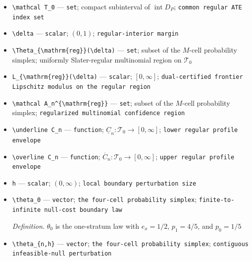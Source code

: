 \documentclass{article}
\begin{document}
\begin{itemize}
  \item \texttt{\textbackslash{}\allowbreak{}mathcal T\_\allowbreak{}0} --- \texttt{set}; compact subinterval of \(\operatorname{int}D_P\); \texttt{common regular ATE index set}
  \item \texttt{\textbackslash{}\allowbreak{}delta} --- \texttt{scalar}; \((0,1)\); \texttt{regular-\allowbreak{}interior margin}
  \item \texttt{\textbackslash{}\allowbreak{}Theta\_\allowbreak{}\{\textbackslash{}\allowbreak{}mathrm\{reg\}\allowbreak{}\}\allowbreak{}(\textbackslash{}\allowbreak{}delta)} --- \texttt{set}; subset of the \(M\)-cell probability simplex; uniformly Slater-regular multinomial region on \(\mathcal T_0\)
  \item \texttt{L\_\allowbreak{}\{\textbackslash{}\allowbreak{}mathrm\{reg\}\allowbreak{}\}\allowbreak{}(\textbackslash{}\allowbreak{}delta)} --- \texttt{scalar}; \([0,\infty]\); \texttt{dual-\allowbreak{}certified frontier Lipschitz modulus on the regular region}
  \item \texttt{\textbackslash{}\allowbreak{}mathcal A\_\allowbreak{}n\textasciicircum{}\{\textbackslash{}\allowbreak{}mathrm\{reg\}\allowbreak{}\}\allowbreak{}} --- \texttt{set}; subset of the \(M\)-cell probability simplex; \texttt{regularized multinomial confidence region}
  \item \texttt{\textbackslash{}\allowbreak{}underline C\_\allowbreak{}n} --- \texttt{function}; \(\underline C_n:\mathcal T_0\to[0,\infty]\); \texttt{lower regular profile envelope}
  \item \texttt{\textbackslash{}\allowbreak{}overline C\_\allowbreak{}n} --- \texttt{function}; \(\overline C_n:\mathcal T_0\to[0,\infty]\); \texttt{upper regular profile envelope}
  \item \texttt{h} --- \texttt{scalar}; \((0,\infty)\); \texttt{local boundary perturbation size}
  \item \texttt{\textbackslash{}\allowbreak{}theta\_\allowbreak{}0} --- \texttt{vector}; \texttt{the four-\allowbreak{}cell probability simplex}; \texttt{finite-\allowbreak{}to-\allowbreak{}infinite null-\allowbreak{}cost boundary law}
  \par\smallskip\noindent\emph{Definition.} \(\theta_0\) is the one-stratum law with \(e_x=1/2\), \(p_1=4/5\), and \(p_0=1/5\)
  \item \texttt{\textbackslash{}\allowbreak{}theta\_\allowbreak{}\{n,\allowbreak{}h\}\allowbreak{}} --- \texttt{vector}; \texttt{the four-\allowbreak{}cell probability simplex}; \texttt{contiguous infeasible-\allowbreak{}null perturbation}

\end{itemize}
\end{document}
